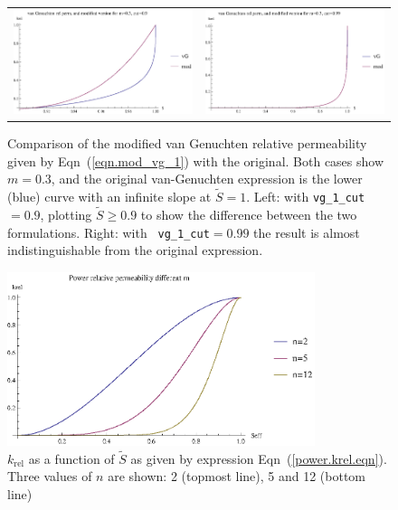 \documentclass[]{scrreprt}
\begin{document}
\begin{figure}[htb]
\centering
\begin{tabular}{cc}
\includegraphics[width=7cm]{vg_krel_mod_1.eps} &
\includegraphics[width=7cm]{vg_krel_mod_2.eps}
\end{tabular}
\caption{Comparison of the modified van Genuchten relative
  permeability given by Eqn~(\ref{eqn.mod_vg_1}) with the original.
  Both cases show $m=0.3$, and the original van-Genuchten expression
  is the lower (blue) curve with an infinite slope at $\tilde{S}=1$.
  Left: with {\tt vg\_1\_cut}$=0.9$, plotting $\tilde{S}\geq 0.9$ to
  show the difference between the two formulations.  Right: with {\tt
    vg\_1\_cut}$=0.99$ the result is almost indistinguishable from the
  original expression.}
\label{vg_krel_mod.fig}
\end{figure}

\begin{figure}[htb]
\centering
\includegraphics[width=9cm]{power_kr.eps}
\caption{$k_{\mathrm{rel}}$ as a function of $\tilde{S}$
  as given by expression Eqn~(\ref{power.krel.eqn}).
Three values  of $n$ are shown: 2 (topmost line), 5 and 12 (bottom line)}
\label{power_krel.fig}
\end{figure}
\end{document}
